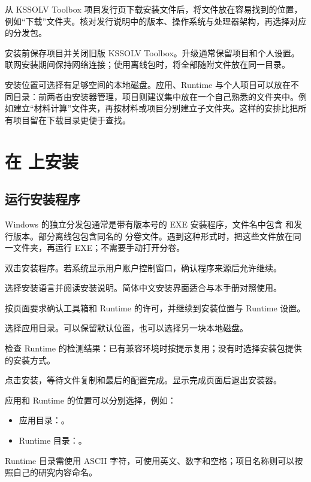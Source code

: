 从 KSSOLV Toolbox 项目发行页下载安装文件后，将文件放在容易找到的位置，例如“下载”文件夹。核对发行说明中的版本、操作系统与处理器架构，再选择对应的分发包。

安装前保存项目并关闭旧版 KSSOLV Toolbox。升级通常保留项目和个人设置。联网安装期间保持网络连接；使用离线包时，将全部随附文件放在同一目录。

安装位置可选择有足够空间的本地磁盘。应用、Runtime 与个人项目可以放在不同目录：前两者由安装器管理，项目则建议集中放在一个自己熟悉的文件夹中。例如建立“材料计算”文件夹，再按材料或项目分别建立子文件夹。这样的安排比把所有项目留在下载目录更便于查找。


\section{在  上安装}

\subsection{运行安装程序}

Windows 的独立分发包通常是带有版本号的 EXE 安装程序，文件名中包含  和发行版本。部分离线包包含同名的  分卷文件。遇到这种形式时，把这些文件放在同一文件夹，再运行 EXE；不需要手动打开分卷。

\begin{steps}
\item 双击安装程序。若系统显示用户账户控制窗口，确认程序来源后允许继续。
\item 选择安装语言并阅读安装说明。简体中文安装界面适合与本手册对照使用。
\item 按页面要求确认工具箱和 Runtime 的许可，并继续到安装位置与 Runtime 设置。
\item 选择应用目录。可以保留默认位置，也可以选择另一块本地磁盘。
\item 检查 Runtime 的检测结果：已有兼容环境时按提示复用；没有时选择安装包提供的安装方式。
\item 点击安装，等待文件复制和最后的配置完成。显示完成页面后退出安装器。
\end{steps}

应用和 Runtime 的位置可以分别选择，例如：
\begin{itemize}[nosep]
\item 应用目录：。
\item Runtime 目录：。
\end{itemize}
Runtime 目录需使用 ASCII 字符，可使用英文、数字和空格；项目名称则可以按照自己的研究内容命名。


